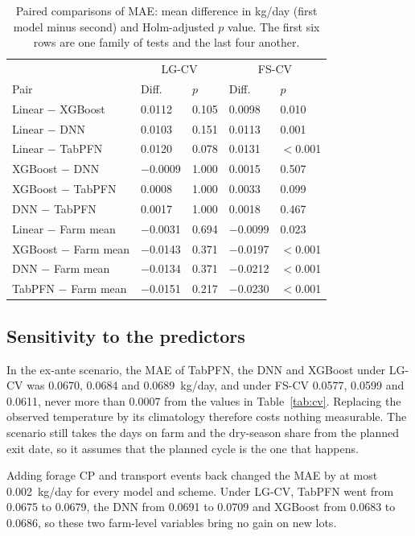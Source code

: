 \documentclass[12pt]{article}
\begin{document}
\begin{table}[!htbp]
\caption{Paired comparisons of MAE: mean difference in kg/day (first model minus second) and Holm-adjusted $p$ value. The first six rows are one family of tests and the last four another.}\label{tab:tests}
\begin{tabular}{p{4.0cm}p{1.8cm}p{1.8cm}p{1.8cm}p{1.8cm}}
\hline
 & \multicolumn{2}{c}{LG-CV} & \multicolumn{2}{c}{FS-CV}\\
Pair & Diff. & $p$ & Diff. & $p$\\
\hline
Linear $-$ XGBoost & 0.0112 & 0.105 & 0.0098 & 0.010\\
Linear $-$ DNN & 0.0103 & 0.151 & 0.0113 & 0.001\\
Linear $-$ TabPFN & 0.0120 & 0.078 & 0.0131 & $<$0.001\\
XGBoost $-$ DNN & $-$0.0009 & 1.000 & 0.0015 & 0.507\\
XGBoost $-$ TabPFN & 0.0008 & 1.000 & 0.0033 & 0.099\\
DNN $-$ TabPFN & 0.0017 & 1.000 & 0.0018 & 0.467\\
Linear $-$ Farm mean & $-$0.0031 & 0.694 & $-$0.0099 & 0.023\\
XGBoost $-$ Farm mean & $-$0.0143 & 0.371 & $-$0.0197 & $<$0.001\\
DNN $-$ Farm mean & $-$0.0134 & 0.371 & $-$0.0212 & $<$0.001\\
TabPFN $-$ Farm mean & $-$0.0151 & 0.217 & $-$0.0230 & $<$0.001\\
\hline
\end{tabular}
\end{table}

\subsection{Sensitivity to the predictors}\label{sec:sens}

In the ex-ante scenario, the MAE of TabPFN, the DNN and XGBoost under LG-CV was 0.0670, 0.0684 and 0.0689~kg/day, and under FS-CV 0.0577, 0.0599 and 0.0611, never more than 0.0007 from the values in Table~\ref{tab:cv}. Replacing the observed temperature by its climatology therefore costs nothing measurable. The scenario still takes the days on farm and the dry-season share from the planned exit date, so it assumes that the planned cycle is the one that happens.

Adding forage CP and transport events back changed the MAE by at most 0.002~kg/day for every model and scheme. Under LG-CV, TabPFN went from 0.0675 to 0.0679, the DNN from 0.0691 to 0.0709 and XGBoost from 0.0683 to 0.0686, so these two farm-level variables bring no gain on new lots.
\end{document}
